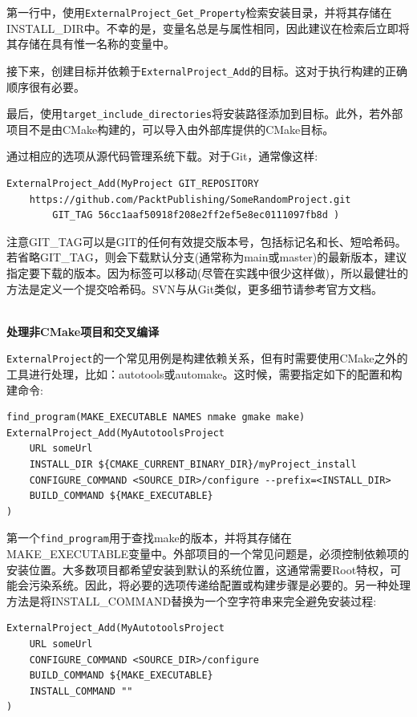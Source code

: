 第一行中，使用\texttt{ExternalProject\_Get\_Property}检索安装目录，并将其存储在INSTALL\_DIR中。不幸的是，变量名总是与属性相同，因此建议在检索后立即将其存储在具有惟一名称的变量中。

接下来，创建目标并依赖于\texttt{ExternalProject\_Add}的目标。这对于执行构建的正确顺序很有必要。

最后，使用\texttt{target\_include\_directories}将安装路径添加到目标。此外，若外部项目不是由CMake构建的，可以导入由外部库提供的CMake目标。

通过相应的选项从源代码管理系统下载。对于Git，通常像这样:

\begin{lstlisting}[style=styleCMake]
ExternalProject_Add(MyProject GIT_REPOSITORY
	https://github.com/PacktPublishing/SomeRandomProject.git
		GIT_TAG 56cc1aaf50918f208e2ff2ef5e8ec0111097fb8d )
\end{lstlisting}

注意GIT\_TAG可以是GIT的任何有效提交版本号，包括标记名和长、短哈希码。若省略GIT\_TAG，则会下载默认分支(通常称为main或master)的最新版本，建议指定要下载的版本。因为标签可以移动(尽管在实践中很少这样做)，所以最健壮的方法是定义一个提交哈希码。SVN与从Git类似，更多细节请参考官方文档。

\hspace*{\fill} \\ %
\noindent
\textbf{处理非CMake项目和交叉编译}

\texttt{ExternalProject}的一个常见用例是构建依赖关系，但有时需要使用CMake之外的工具进行处理，比如：autotools或automake。这时候，需要指定如下的配置和构建命令:

\begin{lstlisting}[style=styleCMake]
find_program(MAKE_EXECUTABLE NAMES nmake gmake make)
ExternalProject_Add(MyAutotoolsProject
	URL someUrl
	INSTALL_DIR ${CMAKE_CURRENT_BINARY_DIR}/myProject_install
	CONFIGURE_COMMAND <SOURCE_DIR>/configure --prefix=<INSTALL_DIR>
	BUILD_COMMAND ${MAKE_EXECUTABLE}
)
\end{lstlisting}

第一个\texttt{find\_program}用于查找make的版本，并将其存储在MAKE\_EXECUTABLE变量中。外部项目的一个常见问题是，必须控制依赖项的安装位置。大多数项目都希望安装到默认的系统位置，这通常需要Root特权，可能会污染系统。因此，将必要的选项传递给配置或构建步骤是必要的。另一种处理方法是将INSTALL\_COMMAND替换为一个空字符串来完全避免安装过程:

\begin{lstlisting}[style=styleCMake]
ExternalProject_Add(MyAutotoolsProject
	URL someUrl
	CONFIGURE_COMMAND <SOURCE_DIR>/configure
	BUILD_COMMAND ${MAKE_EXECUTABLE}
	INSTALL_COMMAND ""
)
\end{lstlisting}

